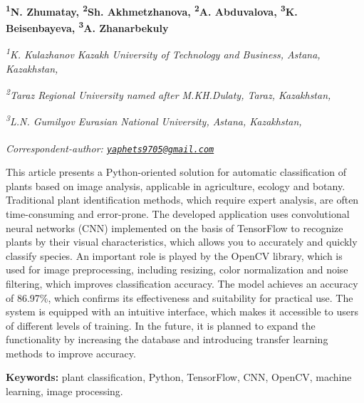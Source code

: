 
\begin{articleheader}

{\bfseries
\textsuperscript{1}N. Zhumatay\authorid,
\textsuperscript{2}Sh. Akhmetzhanova\authorid,
\textsuperscript{2}A. Abduvalova\authorid,
\textsuperscript{3}K. Beisenbayeva\authorid,
\textsuperscript{3}A. Zhanarbekuly\textsuperscript{\envelope } \authorid}
\end{articleheader}

\begin{affiliation}
\emph{\textsuperscript{1}K. Kulazhanov Kazakh University of Technology and Business, Astana, Kazakhstan,}

\emph{\textsuperscript{2}Taraz Regional University named after M.KH.Dulaty, Taraz, Kazakhstan,}

\emph{\textsuperscript{3}L.N. Gumilyov Eurasian National University, Astana, Kazakhstan,}

\raggedright \textsuperscript{\envelope }{\em Correspondent-author: \href{mailto:yaphets9705@gmail.com}{\nolinkurl{yaphets9705@gmail.com}}}
\end{affiliation}

This article presents a Python-oriented solution for automatic
classification of plants based on image analysis, applicable in
agriculture, ecology and botany. Traditional plant identification
methods, which require expert analysis, are often time-consuming and
error-prone. The developed application uses convolutional neural
networks (CNN) implemented on the basis of TensorFlow to recognize
plants by their visual characteristics, which allows you to accurately
and quickly classify species. An important role is played by the OpenCV
library, which is used for image preprocessing, including resizing,
color normalization and noise filtering, which improves classification
accuracy. The model achieves an accuracy of 86.97\%, which confirms its
effectiveness and suitability for practical use. The system is equipped
with an intuitive interface, which makes it accessible to users of
different levels of training. In the future, it is planned to expand the
functionality by increasing the database and introducing transfer
learning methods to improve accuracy.

{\bfseries Keywords:} plant classification, Python, TensorFlow, CNN,
OpenCV, machine learning, image processing.

